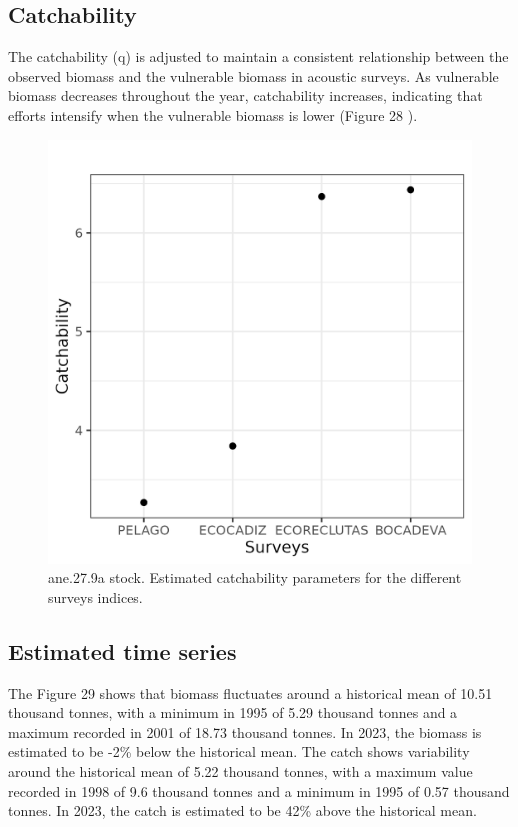 \documentclass[
]{article}
\begin{document}
\hypertarget{catchability-1}{%
\subsection{Catchability}\label{catchability-1}}

The catchability (q) is adjusted to maintain a consistent relationship
between the observed biomass and the vulnerable biomass in acoustic
surveys. As vulnerable biomass decreases throughout the year,
catchability increases, indicating that efforts intensify when the
vulnerable biomass is lower (Figure 28 ).

\begin{figure}[H]

{\centering \includegraphics[width=0.95\linewidth]{report/run/S1.0_4FLEETS/fig_catchability} 

}

\caption{ane.27.9a stock. Estimated catchability parameters for the different surveys indices.}\label{fig:unnamed-chunk-37}
\end{figure}

\hypertarget{estimated-time-series}{%
\subsection{Estimated time series}\label{estimated-time-series}}

The Figure 29 shows that biomass fluctuates around a historical mean of
10.51 thousand tonnes, with a minimum in 1995 of 5.29 thousand tonnes
and a maximum recorded in 2001 of 18.73 thousand tonnes. In 2023, the
biomass is estimated to be -2\% below the historical mean. The catch
shows variability around the historical mean of 5.22 thousand tonnes,
with a maximum value recorded in 1998 of 9.6 thousand tonnes and a
minimum in 1995 of 0.57 thousand tonnes. In 2023, the catch is estimated
to be 42\% above the historical mean.
\end{document}
